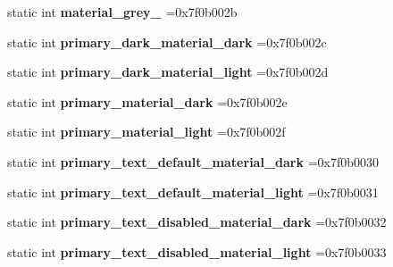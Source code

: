 \begin{DoxyCompactItemize}
static int {\bfseries material\+\_\+grey\+\_} =0x7f0b002b
\item 
\mbox{\label{classandroid_1_1support_1_1design_1_1R_1_1color_a31306d804713e7b1fd3365e368011ea7}} 
static int {\bfseries primary\+\_\+dark\+\_\+material\+\_\+dark} =0x7f0b002c
\item 
\mbox{\label{classandroid_1_1support_1_1design_1_1R_1_1color_a2c1e330c41630544796b52091a4e56bb}} 
static int {\bfseries primary\+\_\+dark\+\_\+material\+\_\+light} =0x7f0b002d
\item 
\mbox{\label{classandroid_1_1support_1_1design_1_1R_1_1color_ac015c970619da55d35713469608eb756}} 
static int {\bfseries primary\+\_\+material\+\_\+dark} =0x7f0b002e
\item 
\mbox{\label{classandroid_1_1support_1_1design_1_1R_1_1color_a211bbc6ab8ca84a096a1d23567bb7278}} 
static int {\bfseries primary\+\_\+material\+\_\+light} =0x7f0b002f
\item 
\mbox{\label{classandroid_1_1support_1_1design_1_1R_1_1color_a6b58f3572503220f322b3ac5e6177566}} 
static int {\bfseries primary\+\_\+text\+\_\+default\+\_\+material\+\_\+dark} =0x7f0b0030
\item 
\mbox{\label{classandroid_1_1support_1_1design_1_1R_1_1color_a9833bf2c8e986e9684514a7c170eacf0}} 
static int {\bfseries primary\+\_\+text\+\_\+default\+\_\+material\+\_\+light} =0x7f0b0031
\item 
\mbox{\label{classandroid_1_1support_1_1design_1_1R_1_1color_a8ced8ca28c3ddfd1463c7d8803ad56eb}} 
static int {\bfseries primary\+\_\+text\+\_\+disabled\+\_\+material\+\_\+dark} =0x7f0b0032
\item 
\mbox{\label{classandroid_1_1support_1_1design_1_1R_1_1color_a283b50e2cc9852d8575fe548afb0e0b7}} 
static int {\bfseries primary\+\_\+text\+\_\+disabled\+\_\+material\+\_\+light} =0x7f0b0033

\end{DoxyCompactItemize}
